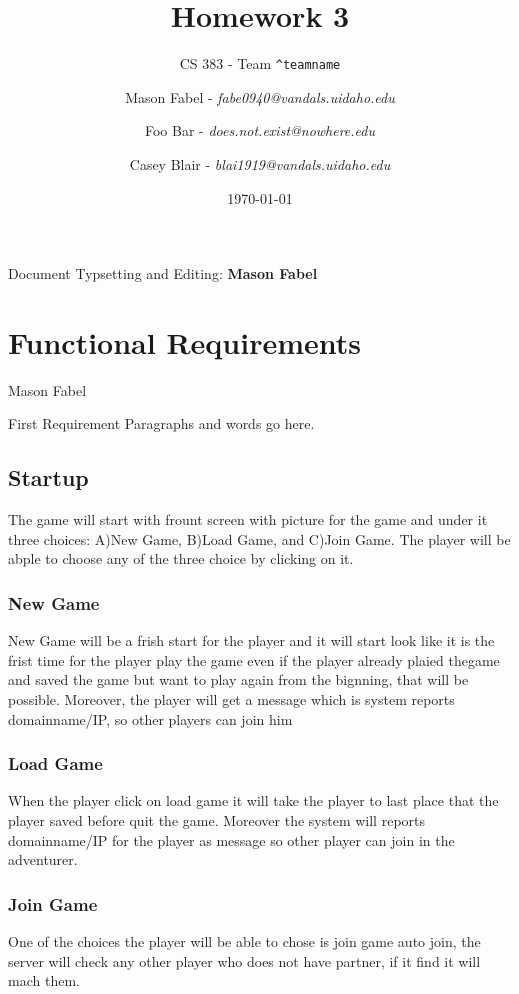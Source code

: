 \documentclass[12pt]{report}
\title{Homework 3}
\subtitle{CS 383 - Team \texttt{\textasciicircum teamname}}
\author{
Mason Fabel - \textit{fabe0940@vandals.uidaho.edu} \\
\and Foo Bar - \textit{does.not.exist@nowhere.edu} \\
\and Casey Blair - \textit{blai1919@vandals.uidaho.edu} \\
}
\date{\today}
\begin{document}
\maketitle

\tableofcontents
Document Typsetting and Editing: \textbf{Mason Fabel}
\clearpage


\chapter{Functional Requirements}

\begin{section}{Mason Fabel}
\begin{subsection}{First Requirement}
Paragraphs and words go here.
  \section{Startup}

		The game will start with frount screen with picture for the game and under it three choices: A)New Game, B)Load Game, and C)Join Game. The player will be abple to choose any of the three choice by clicking on it.

		\subsection{New Game}
		New Game will be a frish start for the player and it will start look like it is the frist time for the player play the game even if the player already plaied thegame and saved the game but want to play again from the bignning, that will be possible. Moreover, the player will get a message which is system reports domainname/IP, so other players can join him
			

		\subsection{Load Game}
 		When the player click on load game it will take the player to last place that the player saved before quit the game. Moreover the system will reports domainname/IP for the player as message so other player can join in the adventurer.
			
		\subsection{Join Game}
		One of the choices the player will be able to chose is join game auto join, the server will check any other player who does not have partner, if it find it will mach them.


\end{subsection}
\end{section}
\end{document}
